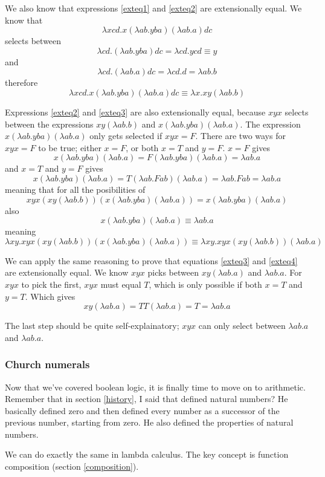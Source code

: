 \documentclass[11pt]{article}
\begin{document}
We also know that expressions \ref{exteq1} and \ref{exteq2} are extensionally
equal. We know that
\[\lambda xcd.x(\lambda ab.yba)(\lambda ab.a)dc\]
selects between
\[\lambda cd.(\lambda ab.yba)dc=\lambda cd.ycd\equiv y\]
and
\[\lambda cd.(\lambda ab.a)dc=\lambda cd.d=\lambda ab.b\]
therefore
\[\lambda xcd.x(\lambda ab.yba)(\lambda ab.a)dc\equiv\lambda x.xy(\lambda ab.b)\]

Expressions \ref{exteq2} and \ref{exteq3} are also extensionally equal, because
\(xyx\) selects between the expressions \(xy(\lambda ab.b)\) and \(x(\lambda
ab.yba)(\lambda ab.a)\). The expression \(x(\lambda ab.yba)(\lambda ab.a)\)
only gets selected if \(xyx=F\). There are two ways for \(xyx=F\) to be true;
either \(x=F\), or both \(x=T\) and \(y=F\). \(x=F\) gives
\[x(\lambda ab.yba)(\lambda ab.a)=F(\lambda ab.yba)(\lambda ab.a)=\lambda ab.a\]
and \(x=T\) and \(y=F\) gives
\[
	x(\lambda ab.yba)(\lambda ab.a)
	=T(\lambda ab.Fab)(\lambda ab.a)
	=\lambda ab.Fab
	=\lambda ab.a
\]
meaning that for all the posibilities of
\[
	xyx(xy(\lambda ab.b))(x(\lambda ab.yba)(\lambda ab.a))
	=x(\lambda ab.yba)(\lambda ab.a)
\]
also
\[x(\lambda ab.yba)(\lambda ab.a)\equiv\lambda ab.a\]
meaning
\[
	\lambda xy.xyx(xy(\lambda ab.b))(x(\lambda ab.yba)(\lambda ab.a))
	\equiv\lambda xy.xyx(xy(\lambda ab.b))(\lambda ab.a)
\]

We can apply the same reasoning to prove that equations \ref{exteq3} and
\ref{exteq4} are extensionally equal. We know \(xyx\) picks between
\(xy(\lambda ab.a)\) and \(\lambda ab.a\). For \(xyx\) to pick the first,
\(xyx\) must equal \(T\), which is only possible if both \(x=T\) and \(y=T\).
Which gives
\[xy(\lambda ab.a)=TT(\lambda ab.a)=T=\lambda ab.a\]

The last step should be quite self-explainatory; \(xyx\) can only select
between \(\lambda ab.a\) and \(\lambda ab.a\).

\subsubsection{Church numerals}

Now that we've covered boolean logic, it is finally time to move on to
arithmetic. Remember that in section \ref{history}, I said that
\textcite{peano1889} defined natural numbers? He basically defined zero and
then defined every number as a successor of the previous number, starting from
zero. He also defined the properties of natural numbers.

We can do exactly the same in lambda calculus. The key concept is function
composition (section \ref{composition}).
\end{document}
